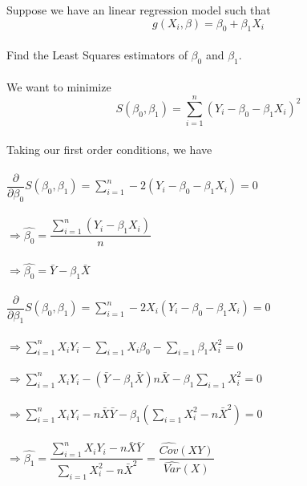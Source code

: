 \documentclass{article}
\begin{document}
\begin{itemize}
    Suppose we have an linear regression model such that\\
    $$g(X_i,\beta)=\beta_0+\beta_1X_i$$\\
    Find the Least Squares estimators of $\beta_0$ and $\beta_1$.\\\\
    We want to minimize\\
    $$S(\beta_0,\beta_1)=\sum_{i=1}^n(Y_i-\beta_0-\beta_1X_i)^2$$\\
    Taking our first order conditions, we have\\\\
    $\dfrac{\partial}{\partial\beta_0}S(\beta_0,\beta_1)=\sum_{i=1}^n-2(Y_i-\beta_0-\beta_1X_i)=0$\\\\
    $\Rightarrow\hat{\beta_0}=\dfrac{\sum_{i=1}^n(Y_i-\beta_1X_i)}{n}$\\\\
    $\Rightarrow\hat{\beta_0}=\bar{Y}-\beta_1\bar{X}$\\\\
    $\dfrac{\partial}{\partial\beta_1}S(\beta_0,\beta_1)=\sum_{i=1}^n-2X_i(Y_i-\beta_0-\beta_1X_i)=0$\\\\
    $\Rightarrow\sum_{i=1}^nX_iY_i-\sum_{i=1}X_i\beta_0-\sum_{i=1}\beta_1X_i^2=0$\\\\
    $\Rightarrow\sum_{i=1}^nX_iY_i-(\bar{Y}-\beta_1\bar{X})n\bar{X}-\beta_1\sum_{i=1}X_i^2=0$\\\\
    $\Rightarrow\sum_{i=1}^nX_iY_i-n\bar{X}\bar{Y}-\beta_1(\sum_{i=1}X_i^2-n\bar{X}^2)=0$\\\\
    $\Rightarrow\hat{\beta_1}=\dfrac{\sum_{i=1}^nX_iY_i-n\bar{X}\bar{Y}}{\sum_{i=1}X_i^2-n\bar{X}^2}=\dfrac{\hat{Cov}(XY)}{\hat{Var}(X)}$\\\\
\end{itemize}
\pagebreak
\end{document}
